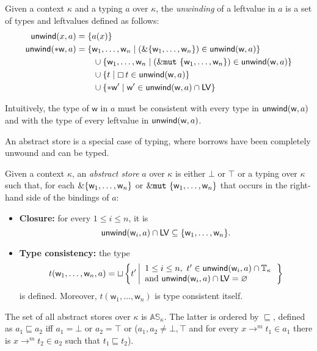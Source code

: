 \begin{definition}\label{def:unwind}
  Given a context $\kappa$ and a typing $a$ over $\kappa$, the \emph{unwinding} of a leftvalue
  in $a$ is a set of types and leftvalues defined as follows:
  \begin{align*}
  \mathsf{unwind}(x,a)&=\{a(x)\}\\
  \mathsf{unwind}(\mathtt{*}\mathsf{w},a)&=
  \{\mathsf{w}_1,\ldots,\mathsf{w}_n\mid(\&\{\mathsf{w}_1,\ldots,\mathsf{w}_n\})\in\mathsf{unwind}(\mathsf{w},a)\}\\
  &\qquad\cup\{\mathsf{w}_1,\ldots,\mathsf{w}_n\mid(\&\mathtt{mut}\ \{\mathsf{w}_1,\ldots,\mathsf{w}_n\})\in\mathsf{unwind}(\mathsf{w},a)\}\\
  &\qquad\cup\{t\mid\boxempty\,{t}\in\mathsf{unwind}(\mathsf{w},a)\}\\
  &\qquad\cup\{\mathtt{*}\mathsf{w}'\mid\mathsf{w}'\in\mathsf{unwind}(\mathsf{w},a)\cap\mathsf{LV}\}
  \end{align*}
\end{definition}

\noindent
Intuitively, the type of $\mathsf{w}$ in $a$ must be consistent with every type
in $\mathsf{unwind}(\mathsf{w},a)$ and with the type of every leftvalue in $\mathsf{unwind}(\mathsf{w},a)$.

An abstract store is a special case of typing, where borrows have been completely unwound
and can be typed.

\begin{definition}\label{def:abstract-store}
  Given a context $\kappa$, an \emph{abstract store} $a$ over $\kappa$ is either $\bot$ or $\top$
  or a typing over $\kappa$ such that, for each $\&\{\mathsf{w}_1,\ldots,\mathsf{w}_n\}$
    or $\&\mathtt{mut}\ \{\mathsf{w}_1,\ldots,\mathsf{w}_n\}$ that occurs in the right-hand side
    of the bindings of $a$:
  \begin{itemize}
  \item \textbf{Closure:} for every $1\le i\le n$, it is
    \[
    \mathsf{unwind}(\mathsf{w}_i,a)\cap\mathsf{LV}\subseteq\{\mathsf{w}_1,\ldots,\mathsf{w}_n\}.
    \]
  \item \textbf{Type consistency:} the type
    \[
    t(\mathsf{w}_1,\ldots,\mathsf{w}_n,a)=\sqcup\left\{t'\left|
    \begin{array}{l}
      1\le i\le n,\ t'\in\mathsf{unwind}(\mathsf{w}_i,a)\cap\mathbb{T}_\kappa\\
      \text{and }\mathsf{unwind}(\mathsf{w}_i,a)\cap\mathsf{LV}=\varnothing
    \end{array}
    \right.\right\}
    \]
    is defined. Moreover, $t(\mathsf{w}_1,\ldots,\mathsf{w}_n)$ is type consistent itself.
  \end{itemize}
  The set of all abstract stores over $\kappa$ is $\mathbb{AS}_\kappa$.
  The latter is ordered by $\sqsubseteq$, defined as $a_1\sqsubseteq a_2$ iff
  $a_1=\bot$ or $a_2=\top$ or
  ($a_1,a_2\not=\bot,\top$ and for every $x\to^mt_1\in a_1$ there is $x\to^mt_2\in a_2$
  such that $t_1\sqsubseteq t_2$).
\end{definition}

